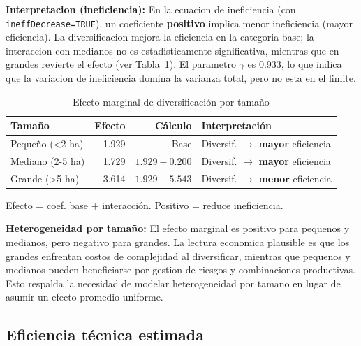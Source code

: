 \documentclass[10pt,a4paper]{article}
\begin{document}
\textbf{Interpretacion (ineficiencia):} En la ecuacion de ineficiencia (con \texttt{ineffDecrease=TRUE}), un coeficiente \textbf{positivo} implica menor ineficiencia (mayor eficiencia). La diversificacion mejora la eficiencia en la categoria base; la interaccion con medianos no es estadisticamente significativa, mientras que en grandes revierte el efecto (ver Tabla~\ref{tab:marginal_diversif}). El parametro $\gamma$ es 0.933, lo que indica que la variacion de ineficiencia domina la varianza total, pero no esta en el limite.

\begin{table}[H]
\centering
\caption{Efecto marginal de diversificación por tamaño}
\label{tab:marginal_diversif}
\begin{threeparttable}
\small
\begin{tabular}{lrrl}
\toprule
\textbf{Tamaño} & \textbf{Efecto} & \textbf{Cálculo} & \textbf{Interpretación} \\
\midrule
Pequeño (<2 ha) & 1.929 & Base & Diversif. $\rightarrow$ \textbf{mayor} eficiencia \\
Mediano (2-5 ha) & 1.729 & $1.929-0.200$ & Diversif. $\rightarrow$ \textbf{mayor} eficiencia \\
Grande (>5 ha) & -3.614 & $1.929-5.543$ & Diversif. $\rightarrow$ \textbf{menor} eficiencia \\
\bottomrule
\end{tabular}
\begin{tablenotes}
\footnotesize
\item Efecto = coef. base + interacción. Positivo = reduce ineficiencia.
\end{tablenotes}
\end{threeparttable}
\end{table}

\textbf{Heterogeneidad por tamaño:} El efecto marginal es positivo para pequenos y medianos, pero negativo para grandes. La lectura economica plausible es que los grandes enfrentan costos de complejidad al diversificar, mientras que pequenos y medianos pueden beneficiarse por gestion de riesgos y combinaciones productivas. Esto respalda la necesidad de modelar heterogeneidad por tamano en lugar de asumir un efecto promedio uniforme.

\subsection{Eficiencia técnica estimada}
\end{document}
